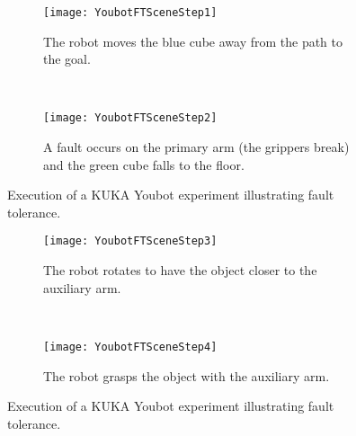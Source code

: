 {\begin{experiment}
\end{experiment}

\begin{figure}[h!]
      \begin{subfigure}[b]{1\columnwidth}
                \centering
                \texttt{[image: YoubotFTSceneStep1]}%
                \caption{The robot moves the blue cube away from the path to the goal.}
                 \label{planning:SI.fig.youbotftstep1}  
        \end{subfigure}         
        ~
              \begin{subfigure}[b]{1\columnwidth}
                \centering
                \texttt{[image: YoubotFTSceneStep2]}
                \caption{A fault occurs on the primary arm (the grippers break) and the green cube falls to the floor.}
                 \label{planning:SI.fig.youbotftstep2}  
        \end{subfigure} 
        \caption{Execution of a KUKA Youbot  experiment illustrating fault tolerance.}
        \label{planning:SI.fig.youftscreen2}
\end{figure}
\clearpage

\begin{figure}[t]
              \begin{subfigure}[b]{1\columnwidth}
                \centering
                \texttt{[image: YoubotFTSceneStep3]}
                \caption{The robot rotates to have the object closer to the auxiliary arm.}
                 \label{planning:SI.fig.youbotftstep3}  
        \end{subfigure}      
        ~   
              \begin{subfigure}[b]{1\columnwidth}
                \centering
                \texttt{[image: YoubotFTSceneStep4]}
                \caption{The robot grasps the object with the auxiliary arm.}
                 \label{planning:SI.fig.youbotftstep4}  
        \end{subfigure}        
        \caption{Execution of a KUKA Youbot  experiment illustrating fault tolerance.}
        \label{planning:SI.fig.youftscreen2bis}
\end{figure}

}
